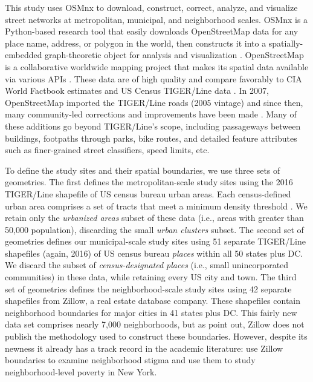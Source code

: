 \documentclass[Afour,sageh,times]{sagej}
\renewcommand{\cite}{\citep}
\begin{document}
This study uses OSMnx to download, construct, correct, analyze, and visualize street networks at metropolitan, municipal, and neighborhood scales. OSMnx is a Python-based research tool that easily downloads OpenStreetMap data for any place name, address, or polygon in the world, then constructs it into a spatially-embedded graph-theoretic object for analysis and visualization \cite{redacted_osmnx:_2017}. OpenStreetMap is a collaborative worldwide mapping project that makes its spatial data available via various APIs \cite{corcoran_analysing_2013, jokar_arsanjani_openstreetmap_2015}. These data are of high quality and compare favorably to CIA World Factbook estimates and US Census TIGER/Line data \cite{haklay_how_2010, over_generating_2010, zielstra_comparative_2011, maron_how_2015, wu_improving_2005, frizzelle_importance_2009}. In 2007, OpenStreetMap imported the TIGER/Line roads (2005 vintage) and since then, many community-led corrections and improvements have been made \cite{willis_openstreetmap_2008}. Many of these additions go beyond TIGER/Line's scope, including passageways between buildings, footpaths through parks, bike routes, and detailed feature attributes such as finer-grained street classifiers, speed limits, etc.

To define the study sites and their spatial boundaries, we use three sets of geometries. The first defines the metropolitan-scale study sites using the 2016 TIGER/Line shapefile of US census bureau urban areas. Each census-defined urban area comprises a set of tracts that meet a minimum density threshold \cite{u.s._census_bureau_2010_2010}. We retain only the \emph{urbanized areas} subset of these data (i.e., areas with greater than 50,000 population), discarding the small \emph{urban clusters} subset. The second set of geometries defines our municipal-scale study sites using 51 separate TIGER/Line shapefiles (again, 2016) of US census bureau \emph{places} within all 50 states plus DC. We discard the subset of \emph{census-designated places} (i.e., small unincorporated communities) in these data, while retaining every US city and town. The third set of geometries defines the neighborhood-scale study sites using 42 separate shapefiles from Zillow, a real estate database company. These shapefiles contain neighborhood boundaries for major cities in 41 states plus DC. This fairly new data set comprises nearly 7,000 neighborhoods, but as \citet{schernthanner_spatial_2016} point out, Zillow does not publish the methodology used to construct these boundaries. However, despite its newness it already has a track record in the academic literature: \citet{besbris_effect_2015} use Zillow boundaries to examine neighborhood stigma and \citet{albrecht_indicator_2014} use them to study neighborhood-level poverty in New York.
\end{document}

